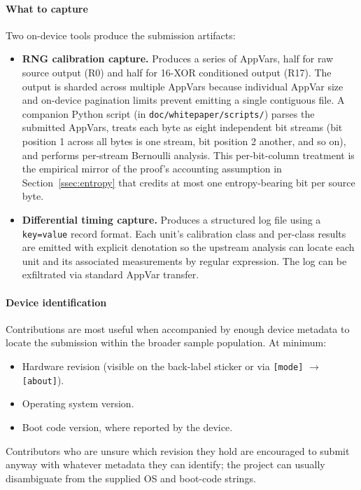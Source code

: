 \documentclass[titlepage]{report}
\begin{document}
	\paragraph{What to capture}
	Two on-device tools produce the submission artifacts:
	\begin{itemize}
		\item \textbf{RNG calibration capture.} Produces a series of AppVars, half for raw source output (R0) and half for 16-XOR conditioned output (R17). The output is sharded across multiple AppVars because individual AppVar size and on-device pagination limits prevent emitting a single contiguous file. A companion Python script (in \texttt{doc/whitepaper/scripts/}) parses the submitted AppVars, treats each byte as eight independent bit streams (bit position 1 across all bytes is one stream, bit position 2 another, and so on), and performs per-stream Bernoulli analysis. This per-bit-column treatment is the empirical mirror of the proof's accounting assumption in Section~\ref{ssec:entropy} that credits at most one entropy-bearing bit per source byte.
		\item \textbf{Differential timing capture.} Produces a structured log file using a \texttt{key=value} record format. Each unit's calibration class and per-class results are emitted with explicit denotation so the upstream analysis can locate each unit and its associated measurements by regular expression. The log can be exfiltrated via standard AppVar transfer.
	\end{itemize}

	\paragraph{Device identification}
	Contributions are most useful when accompanied by enough device metadata to locate the submission within the broader sample population. At minimum:
	\begin{itemize}
		\item Hardware revision (visible on the back-label sticker or via \texttt{[mode]} $\rightarrow$ \texttt{[about]}).
		\item Operating system version.
		\item Boot code version, where reported by the device.
	\end{itemize}
	Contributors who are unsure which revision they hold are encouraged to submit anyway with whatever metadata they can identify; the project can usually disambiguate from the supplied OS and boot-code strings.
\end{document}
